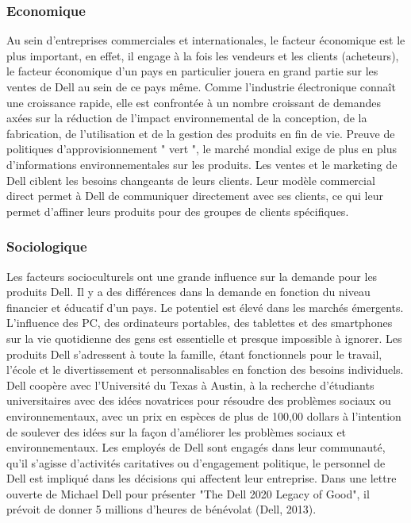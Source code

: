 \documentclass{bredele} %
\begin{document}
                    \subsubsection*{Economique}
                    Au sein d’entreprises commerciales et internationales, le facteur économique est le plus important, en effet, il engage à la fois les vendeurs et les clients (acheteurs), le facteur économique d’un pays en particulier jouera en grand partie sur les ventes de Dell au sein de ce pays même.
    \newline
    Comme l'industrie électronique connaît une croissance rapide, elle est confrontée à un nombre croissant de demandes axées sur la réduction de l'impact environnemental de la conception, de la fabrication, de l'utilisation et de la gestion des produits en fin de vie. Preuve de politiques d'approvisionnement " vert ", le marché mondial exige de plus en plus d'informations environnementales sur les produits. Les ventes et le marketing de Dell ciblent les besoins changeants de leurs clients. Leur modèle commercial direct permet à Dell de communiquer directement avec ses clients, ce qui leur permet d'affiner leurs produits pour des groupes de clients spécifiques.
                    \subsubsection*{Sociologique}
                    Les facteurs socioculturels ont une grande influence sur la demande pour les produits Dell. Il y a des différences dans la demande en fonction du niveau financier et éducatif d'un pays.
    \newline
    Le potentiel est élevé dans les marchés émergents. L'influence des PC, des ordinateurs portables, des tablettes et des smartphones sur la vie quotidienne des gens est essentielle et presque impossible à ignorer.
    \newline
    Les produits Dell s'adressent à toute la famille, étant fonctionnels pour le travail, l'école et le divertissement et personnalisables en fonction des besoins individuels.
    \newline
    Dell coopère avec l'Université du Texas à Austin, à la recherche d'étudiants universitaires avec des idées novatrices pour résoudre des problèmes sociaux ou environnementaux, avec un prix en espèces de plus de 100,00 dollars à l'intention de soulever des idées sur la façon d'améliorer les problèmes sociaux et environnementaux.
    \newline
    Les employés de Dell sont engagés dans leur communauté, qu'il s'agisse d'activités caritatives ou d'engagement politique, le personnel de Dell est impliqué dans les décisions qui affectent leur entreprise. Dans une lettre ouverte de Michael Dell pour présenter "The Dell 2020 Legacy of Good", il prévoit de donner 5 millions d'heures de bénévolat (Dell, 2013).
\end{document}
